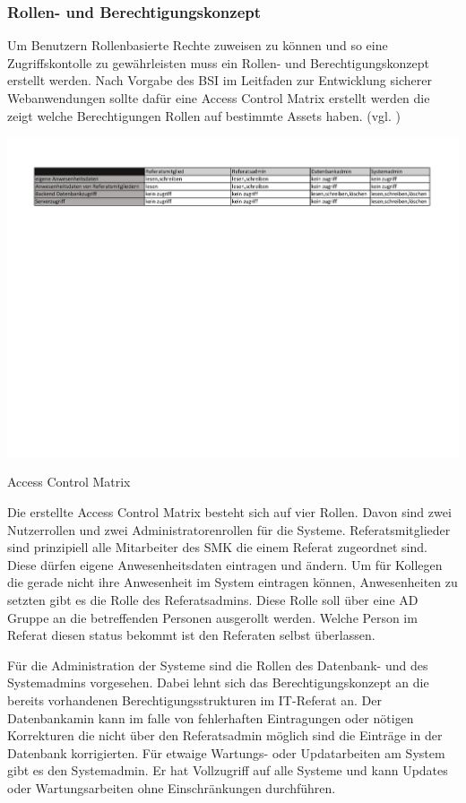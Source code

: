 \subsubsection{Rollen- und Berechtigungskonzept}
\label{sec:RollenBerechtigungskonzept}
Um Benutzern Rollenbasierte Rechte zuweisen zu können und so eine Zugriffskontolle zu gewährleisten muss ein Rollen- und Berechtigungskonzept erstellt werden. Nach Vorgabe des BSI im Leitfaden zur Entwicklung sicherer Webanwendungen sollte dafür eine Access Control Matrix erstellt werden die zeigt welche Berechtigungen Rollen auf bestimmte Assets haben. (vgl. \cite[S.26]{BSIWeb})

\begin{table}[htbp]
    \centering
    \includegraphics[width=1\textwidth,angle=0]{abb/Berechtigungsmatrix.pdf}
    \caption[Beschreibung]{Access Control Matrix}
    \label{abb:AccessControlMatrix}
\end{table}

Die erstellte Access Control Matrix besteht sich auf vier Rollen. Davon sind zwei Nutzerrollen und zwei Administratorenrollen für die Systeme. Referatsmitglieder sind prinzipiell alle Mitarbeiter des SMK die einem Referat zugeordnet sind. Diese dürfen eigene Anwesenheitsdaten eintragen und \ggfs ändern. Um für Kollegen die gerade nicht ihre Anwesenheit im System eintragen können, Anwesenheiten zu setzten gibt es die Rolle des Referatsadmins. Diese Rolle soll über eine AD Gruppe an die betreffenden Personen ausgerollt werden. Welche Person im Referat diesen status bekommt ist den Referaten selbst überlassen.

Für die Administration der Systeme sind die Rollen des Datenbank- und des Systemadmins vorgesehen. Dabei lehnt sich das Berechtigungskonzept an die bereits vorhandenen Berechtigungsstrukturen im IT-Referat an. Der Datenbankamin kann im falle von fehlerhaften Eintragungen oder nötigen Korrekturen die nicht über den Referatsadmin möglich sind die Einträge in der Datenbank korrigierten. Für etwaige Wartungs- oder Updatarbeiten am System gibt es den Systemadmin. Er hat Vollzugriff auf alle Systeme und kann Updates oder Wartungsarbeiten ohne Einschränkungen durchführen.



